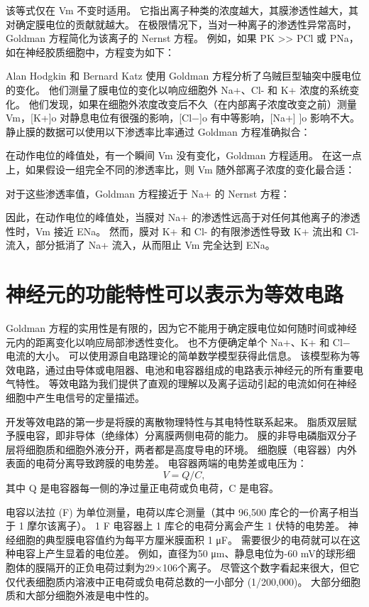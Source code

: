 该等式仅在 Vm 不变时适用。 它指出离子种类的浓度越大，其膜渗透性越大，其对确定膜电位的贡献就越大。 在极限情况下，当对一种离子的渗透性异常高时，Goldman 方程简化为该离子的 Nernst 方程。 例如，如果 PK >> PCl 或 PNa，如在神经胶质细胞中，方程变为如下：

Alan Hodgkin 和 Bernard Katz 使用 Goldman 方程分析了乌贼巨型轴突中膜电位的变化。 他们测量了膜电位的变化以响应细胞外 Na+、Cl- 和 K+ 浓度的系统变化。 他们发现，如果在细胞外浓度改变后不久（在内部离子浓度改变之前）测量 Vm，[K+]o 对静息电位有很强的影响，[Cl−]o 有中等影响，[Na+] ]o 影响不大。 静止膜的数据可以使用以下渗透率比率通过 Goldman 方程准确拟合：

在动作电位的峰值处，有一个瞬间 Vm 没有变化，Goldman 方程适用。 在这一点上，如果假设一组完全不同的渗透率比，则 Vm 随外部离子浓度的变化最合适：

对于这些渗透率值，Goldman 方程接近于 Na+ 的 Nernst 方程：

因此，在动作电位的峰值处，当膜对 Na+ 的渗透性远高于对任何其他离子的渗透性时，Vm 接近 ENa。 然而，膜对 K+ 和 Cl- 的有限渗透性导致 K+ 流出和 Cl- 流入，部分抵消了 Na+ 流入，从而阻止 Vm 完全达到 ENa。


\section{神经元的功能特性可以表示为等效电路}
Goldman 方程的实用性是有限的，因为它不能用于确定膜电位如何随时间或神经元内的距离变化以响应局部渗透性变化。 也不方便确定单个 Na+、K+ 和 Cl− 电流的大小。 可以使用源自电路理论的简单数学模型获得此信息。 该模型称为等效电路，通过由导体或电阻器、电池和电容器组成的电路表示神经元的所有重要电气特性。 等效电路为我们提供了直观的理解以及离子运动引起的电流如何在神经细胞中产生电信号的定量描述。

开发等效电路的第一步是将膜的离散物理特性与其电特性联系起来。 脂质双层赋予膜电容，即非导体（绝缘体）分离膜两侧电荷的能力。 膜的非导电磷脂双分子层将细胞质和细胞外液分开，两者都是高度导电的环境。 细胞膜（电容器）内外表面的电荷分离导致跨膜的电势差。 电容器两端的电势差或电压为：
\begin{equation}
	V = Q/C,
\end{equation}
其中 Q 是电容器每一侧的净过量正电荷或负电荷，C 是电容。

电容以法拉 (F) 为单位测量，电荷以库仑测量（其中 96,500 库仑的一价离子相当于 1 摩尔该离子）。 1 F 电容器上 1 库仑的电荷分离会产生 1 伏特的电势差。 神经细胞的典型膜电容值约为每平方厘米膜面积 1 μF。 需要很少的电荷就可以在这种电容上产生显着的电位差。 例如，直径为50 μm、静息电位为-60 mV的球形细胞体的膜隔开的正负电荷过剩为29×106个离子。 尽管这个数字看起来很大，但它仅代表细胞质内溶液中正电荷或负电荷总数的一小部分 (1/200,000)。 大部分细胞质和大部分细胞外液是电中性的。


